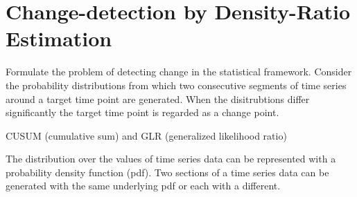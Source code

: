 \section{Change-detection by Density-Ratio Estimation}\label{density-ratio}

Formulate the problem of detecting change in the statistical framework.
Consider the probability distributions from which two consecutive segments of time series around a target time point are generated.
When the disitrubtions differ significantly the target time point is regarded as a change point.




CUSUM (cumulative sum) \cite{basseville1993detection} and GLR (generalized likelihood ratio)


The distribution over the values of time series data can be represented with a probability density function (pdf).
Two sections of a time series data can be generated with the same underlying pdf or each with a different.
